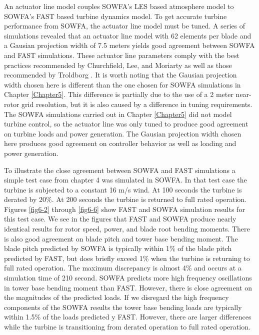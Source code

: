An actuator line model couples SOWFA's LES based atmosphere model to SOWFA's FAST based turbine dynamics model. To get accurate turbine performance from SOWFA, the actuator line model must be tuned. A series of simulations revealed that an actuator line model with 62 elements per blade and a Gausian projection width of 7.5 meters yields good agreement between SOWFA and FAST simulations. These actuator line parameters comply with the best practices recommended by Churchfield, Lee, and Moriarty \cite{churchfield2012} as well as those recommended by Troldborg \cite{troldborg2009}. It is worth noting that the Gausian projection width chosen here is different than the one chosen for SOWFA simulations in Chapter \ref{Chapter5}. This difference is partially due to the use of a 2 meter near-rotor grid resolution, but it is also caused by a difference in tuning requirements. The SOWFA simulations carried out in Chapter \ref{Chapter5} did not model turbine control, so the actuator line was only tuned to produce good agreement on turbine loads and power generation. The Gausian projection width chosen here produces good agreement on controller behavior as well as loading and power generation.

To illustrate the close agreement between SOWFA and FAST simulations a simple test case from chapter 4 was simulated in SOWFA. In that test case the turbine is subjected to a constant 16 m/s wind. At 100 seconds the turbine is derated by 20\%. At 200 seconds the turbine is returned to full rated operation. Figures \ref{fig6-2} through \ref{fig6-6} show FAST and SOWFA simulation results for this test case. We see in the figures that FAST and SOWFA produce nearly identical results for rotor speed, power, and blade root bending moments. There is also good agreement on blade pitch and tower base bending moment. The blade pitch predicted by SOWFA is typically within 1\% of the blade pitch predicted by FAST, but does briefly exceed 1\% when the turbine is returning to full rated operation. The maximum discrepancy is almost 4\% and occurs at a simulation time of 210 second. SOWFA predicts more high frequency oscillations in tower base bending moment than FAST. However, there is close agreement on the magnitudes of the predicted loads. If we disregard the high frequency components of the SOWFA results the tower base bending loads are typically within 1.5\% of the loads predicted y FAST. However, there are larger differences while the turbine is transitioning from derated operation to full rated operation.  


